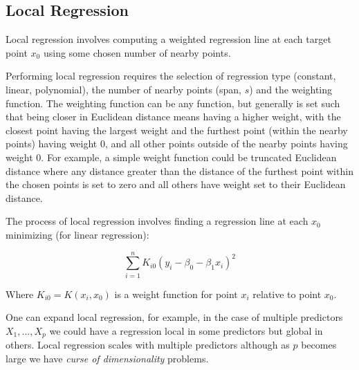 \subsection{Local Regression}

Local regression involves computing a weighted regression line at each target point $x_{0}$ using some chosen number of nearby points.

Performing local regression requires the selection of regression type (constant, linear, polynomial), the number of nearby points (span, $s$) and the weighting function. The weighting function can be any function, but generally is set such that being closer in Euclidean distance means having a higher weight, with the closest point having the largest weight and the furthest point (within the nearby points) having weight 0, and all other points outside of the nearby points having weight 0. For example, a simple weight function could be truncated Euclidean distance where any distance greater than the distance of the furthest point within the chosen points is set to zero and all others have weight set to their Euclidean distance.

The process of local regression involves finding a regression line at each $x_{0}$ minimizing (for linear regression):

$$ \sum^{n}_{i=1} K_{i0}(y_{i}-\beta_{0}-\beta_{1}x_{i})^{2} $$

Where $K_{i0}=K(x_{i},x_{0})$ is a weight function for point $x_{i}$ relative to point $x_{0}$. 

One can expand local regression, for example, in the case of multiple predictors $X_{1},...,X_{p}$ we could have a regression local in some predictors but global in others. Local regression scales with multiple predictors although as $p$ becomes large we have \textit{curse of dimensionality} problems.
